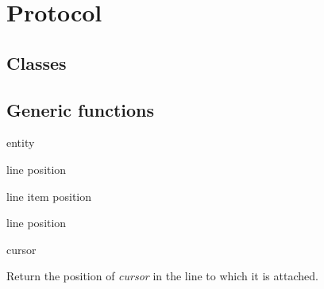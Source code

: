 \appendix

\section{Protocol}

\subsection{Classes}




\subsection{Generic functions}

 {entity}

 {line position}

 {line item position}

 {line position}

 {cursor}

Return the position of \textit{cursor} in the line to which it is
attached.

\ifdetached{}
